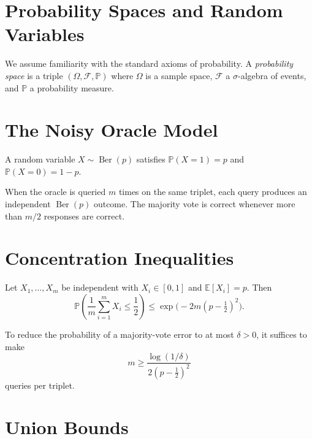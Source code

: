 \section{Probability Spaces and Random Variables}

We assume familiarity with the standard axioms of probability. A \emph{probability space} is a triple $(\Omega, \mathcal{F}, \mathbb{P})$ where $\Omega$ is a sample space, $\mathcal{F}$ a $\sigma$-algebra of events, and $\mathbb{P}$ a probability measure.

\section{The Noisy Oracle Model}

\begin{definition}
A random variable $X \sim \operatorname{Ber}(p)$ satisfies $\mathbb{P}(X = 1) = p$ and $\mathbb{P}(X = 0) = 1 - p$.
\end{definition}

When the oracle is queried $m$ times on the same triplet, each query produces an independent $\operatorname{Ber}(p)$ outcome. The majority vote is correct whenever more than $m/2$ responses are correct.

\section{Concentration Inequalities}

\begin{theorem}
\label{thm:hoeffding}
Let $X_1, \ldots, X_m$ be independent with $X_i \in [0,1]$ and $\mathbb{E}[X_i] = p$. Then
\[
\mathbb{P}\!\left(\frac{1}{m}\sum_{i=1}^m X_i \leq \frac{1}{2}\right)
\leq
\exp\!\bigl(-2m(p - \tfrac{1}{2})^2\bigr).
\]
\end{theorem}

\begin{corollary}
\label{cor:sample_complexity}
To reduce the probability of a majority-vote error to at most $\delta > 0$, it suffices to make
\[
m \geq \frac{\log(1/\delta)}{2(p - \frac{1}{2})^2}
\]
queries per triplet.
\end{corollary}

\section{Union Bounds}

